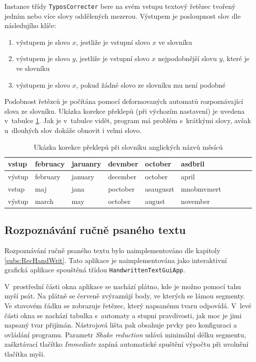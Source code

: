 Instance třídy \verb|TyposCorrecter| bere na svém vstupu textový řetězec tvořený jedním nebo více slovy oddělených mezerou. Výstupem je posloupnost slov dle následujího klíče:
\begin{enumerate}
 \item výstupem je slovo $x$, jestliže je vstupní slovo $x$ ve slovníku
 \item výstupem je slovo $y$, jestliže je vstupní slovo $x$ nejpodobnější slovu $y$, které je ve slovníku
 \item výstupem je slovo $x$, pokud žádné slovo ze slovníku mu není podobné
\end{enumerate}

Podobnost řetězců je počítána pomocí deformovaných automatů rozpoznávající slova ze slovníku. Ukázka korekce překlepů (při výchozím nastavení) je uvedena v~tabulce \ref{tab:TyposOut}. Jak je v~tabulce vidět, program má problém s~krátkými slovy, avšak u~dlouhých slov dokáže obnovit i velmi  slovo.

\begin{table}
 \centering
  \begin{tabular}{|l||l|l|l|l|l|l|l|l|l|}
    \hline
    vstup 	& februacy & jaruanry & devmber  & october & asdbril	\\\hline
    výstup 	& february & january  & december & october & april	\\\hline
    \hline
    vstup 	& maj   & jana & poctober & asauguszt  & mnobmvmert	\\\hline
    výstup	& march & may  & october  & august     & november	\\\hline
  \end{tabular}

 \caption[Ukázka korekce překlepů]{Ukázka korekce překlepů při slovníku anglických názvů měsíců} \label{tab:TyposOut}
\end{table}

\subsection{Rozpoznávání ručně psaného textu}
Rozpoznávání ručně psaného textu bylo naimplementováno dle kapitoly \ref{subs:RecHandWrit}. Tato aplikace je naimplementována jako interaktivní grafická aplikace spouštěná třídou \verb|HandwrittenTextGuiApp|. 

V~prostřední části okna aplikace se nachází plátno, kde je možno pomocí tahu myší psát. Na plátně se červeně zvýraznůjí body, ve kterých se lámou segmenty. Ve stavovém řádku se zobrazuje řetězec, který napsanému tvaru odpovídá. V~levé části okna se nachází tabulka s~automaty a stupni pravdivosti, jak moc je jimi napsaný tvar přijímán. Nástrojová lišta pak obsahuje prvky pro konfiguraci a ovládání programu. Parametr \textit{Shake reduction} udává minimální délku segmentu, zaškrtávací tlačítko \textit{Immediate} zapíná automatické spuštění výpočtu při uvolnění tlačítka myši.

